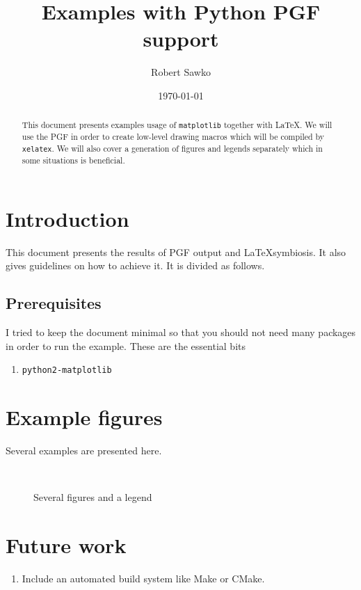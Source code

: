 \documentclass{article}
\date{\today}
\author{Robert Sawko}
\affil{Department of Engineering Computing, Cranfield University}
\title{Examples with Python PGF support}
\begin{document}
\maketitle

\begin{abstract}

  This document presents examples usage of \texttt{matplotlib} together with
  \LaTeX. We will use the PGF in order to create low-level drawing macros which
  will be compiled by \texttt{xelatex}. We will also cover a generation of
  figures and legends separately which in some situations is beneficial. 
\end{abstract}

\section{Introduction}
This document presents the results of PGF output and \LaTeX symbiosis. It also
gives guidelines on how to achieve it. It is divided as follows.

\subsection{Prerequisites}
I tried to keep the document minimal so that you should not need many packages
in order to run the example. These are the essential bits
\begin{enumerate}
  \item \texttt{python2-matplotlib}
\end{enumerate}

\section{Example figures}

Several examples are presented here.

\begin{figure}[b] 
  \centering
   
   
   
  \\
   
  \caption{Several figures and a legend}
  \label{fig:problem} 
\end{figure}

\section{Future work}
\begin{enumerate}
  \item Include an automated build system like Make or CMake.
\end{enumerate}
\end{document}
